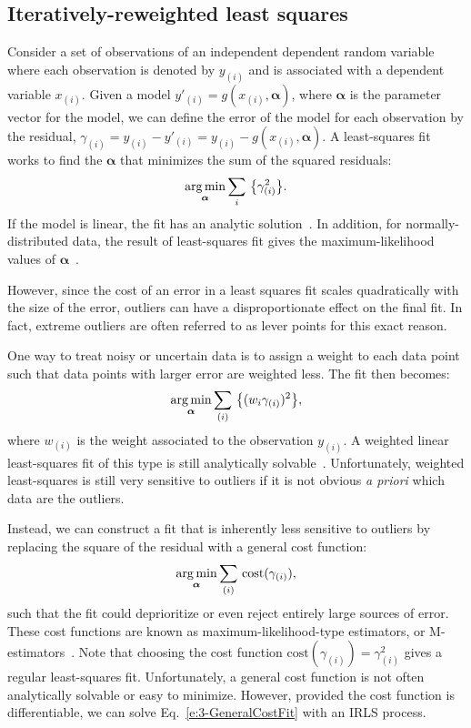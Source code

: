 \subsection{Iteratively-reweighted least squares}
Consider a set of observations of an independent dependent random variable where each observation is denoted by $y_{(i)}$ and is associated with a dependent variable $x_{(i)}$.
Given a model $y'_{(i)} = g(x_{(i)},\bm{\alpha})$, where $\bm{\alpha}$ is the parameter vector for the model, we can define the error of the model for each observation by the residual, $\gamma_{(i)} = y_{(i)} - y'_{(i)} = y_{(i)} - g(x_{(i)},\bm{\alpha})$.
A least-squares fit works to find the $\bm{\alpha}$ that minimizes the sum of the squared residuals:
\begin{equation}
  \operatorname*{arg\,min}_{\bm{\alpha}} \sum\limits_i\, \big \{ \gamma_{(i)}^2\big \}.\label{e:3-LeastSquare}
\end{equation}
If the model is linear, the fit has an analytic solution~\cite{RN269}.
In addition, for normally-distributed data, the result of least-squares fit gives the maximum-likelihood values of $\bm{\alpha}$~\cite{RN269}.

However, since the cost of an error in a least squares fit scales quadratically with the size of the error, outliers can have a disproportionate effect on the final fit.
In fact, extreme outliers are often referred to as lever points for this exact reason.

One way to treat noisy or uncertain data is to assign a weight to each data point such that data points with larger error are weighted less.
The fit then becomes:
\begin{equation}
  \operatorname*{arg\,min}_{\bm{\alpha}} \sum\limits_{(i)}\,\big \{ (w_i \gamma_{(i)})^2 \big \},
\end{equation}
where $w_{(i)}$ is the weight associated to the observation $y_{(i)}$.
A weighted linear least-squares fit of this type is still analytically solvable~\cite{RN269}.
Unfortunately, weighted least-squares is still very sensitive to outliers if it is not obvious \emph{a priori} which data are the outliers.

Instead, we can construct a fit that is inherently less sensitive to outliers by replacing the square of the residual with a general cost function:
\begin{equation}
  \operatorname*{arg\,min}_{\bm{\alpha}} \sum\limits_{(i)}\,\textrm{cost}(\gamma_{(i)}),\label{e:3-GeneralCostFit}
\end{equation}
such that the fit could deprioritize or even reject entirely large sources of error.
These cost functions are known as maximum-likelihood-type estimators, or M-estimators~\cite{RN269}.
Note that choosing the cost function $\textrm{cost}(\gamma_{(i)}) = \gamma_{(i)}^2$ gives a regular least-squares fit.
Unfortunately, a general cost function is not often analytically solvable or easy to minimize.
However, provided the cost function is differentiable, we can solve Eq.~\ref{e:3-GeneralCostFit} with an IRLS process.

